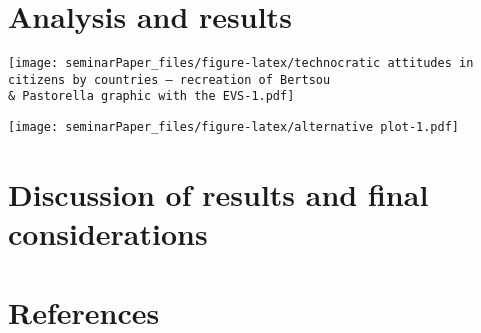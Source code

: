 \documentclass[
  12pt,
  english,
]{article}
\begin{document}
\hypertarget{analysis-and-results}{%
\section{Analysis and results}\label{analysis-and-results}}

\texttt{[image: seminarPaper\_files/figure-latex/technocratic attitudes in citizens by countries --- recreation of Bertsou \\\& Pastorella graphic with the EVS-1.pdf]}

\texttt{[image: seminarPaper\_files/figure-latex/alternative plot-1.pdf]}

\hypertarget{discussion-of-results-and-final-considerations}{%
\section{Discussion of results and final
considerations}\label{discussion-of-results-and-final-considerations}}

\newpage{}

\hypertarget{references}{%
\section{References}\label{references}}
\end{document}

